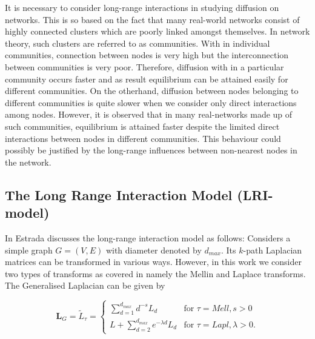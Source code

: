 \documentclass[10pt,a4paper]{article}
\begin{document}
        It is necessary to consider long-range interactions in studying diffusion on networks. This is so based on the fact that many real-world networks consist of highly connected clusters which are poorly linked amongst themselves. In network theory, such clusters are referred to as communities. With in individual communities, connection between nodes is very high but the interconnection between communities is very poor. Therefore, diffusion with in a particular community occurs faster and as result equilibrium can be attained easily for different communities. On the otherhand, diffusion between nodes belonging to different communities is quite slower when we consider only direct interactions among nodes. However, it is observed that in many real-networks made up of such communities, equilibrium is attained faster despite the limited direct interactions between nodes in different communities. This behaviour could possibly be justified by the long-range influences between non-nearest nodes in the network.
        
        \subsection{The Long Range Interaction Model (LRI-model)}
        
         In \citep{estrada2017path} Estrada discusses the long-range interaction model as follows:
          Considers a simple graph $G=(V,E)$ with diameter denoted by $d_{max}$. Its $k$-path Laplacian matrices can be transformed in various ways. However, in this work we consider two types of transforms as covered in \citep{estrada2017path} namely the Mellin and Laplace transforms. The Generalised Laplacian can be given by
        
        \begin{equation}
        \mathbf{L}_{G} = \tilde{L}_{\tau} = \begin{cases} \sum_{d=1}^{d_{max}} d^{-s} L_d &\mbox{for } \tau = Mell, s>0 \\
        L + \sum_{d=2}^{d_{max}} e^{-\lambda d} L_d   & \mbox{for } \tau = Lapl, \lambda>0. \end{cases} 
        \end{equation}
        
\end{document}
